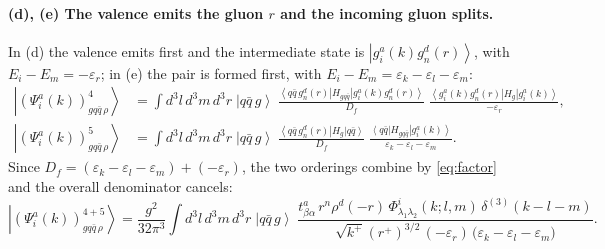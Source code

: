 \documentclass[11pt,a4paper]{article}
\numberwithin{equation}{section}
\newcommand{\eps}{\varepsilon}
\newcommand{\dthree}{\delta^{(3)}}
\newcommand{\ket}[1]{\left|#1\right\rangle}
\newcommand{\bra}[1]{\left\langle#1\right|}
\newcommand{\Ph}{\Phi}
\newcommand{\qk}[3]{q^{#1}_{#2}(#3)}
\newcommand{\aqk}[3]{\bar q^{#1}_{#2}(#3)}
\newcommand{\gl}[3]{g^{#1}_{#2}(#3)}
\begin{document}
\paragraph{(d), (e) The valence emits the gluon $r$ and the incoming gluon splits.}
\begin{center}
\hspace{0.7cm}
\end{center}
In (d) the valence emits first and the intermediate state is
$\ket{\gl{a}{i}{k}\gl{d}{n}{r}}$, with $E_{i}-E_{m}=-\eps_{r}$; in (e) the pair is formed first, with
$E_{i}-E_{m}=\eps_{k}-\eps_{l}-\eps_{m}$:
\begin{align}
\ket{(\Psi^{a}_{i}(k))^{4}_{gq\bar q\,\rho}}&=\int\!d^{3}l\,d^{3}m\,d^{3}r\;\ket{q\bar q\,g}\;
\frac{\bra{q\bar q\,\gl{d}{n}{r}}H_{gq\bar q}\ket{\gl{a}{i}{k}\gl{d}{n}{r}}}{D_{f}}\;
\frac{\bra{\gl{a}{i}{k}\gl{d}{n}{r}}H_{g}\ket{\gl{a}{i}{k}}}{-\eps_{r}},
\\
\ket{(\Psi^{a}_{i}(k))^{5}_{gq\bar q\,\rho}}&=\int\!d^{3}l\,d^{3}m\,d^{3}r\;\ket{q\bar q\,g}\;
\frac{\bra{q\bar q\,\gl{d}{n}{r}}H_{g}\ket{q\bar q}}{D_{f}}\;
\frac{\bra{q\bar q}H_{gq\bar q}\ket{\gl{a}{i}{k}}}{\eps_{k}-\eps_{l}-\eps_{m}} .
\end{align}
Since $D_{f}=(\eps_{k}-\eps_{l}-\eps_{m})+(-\eps_{r})$, the two orderings combine by
\eqref{eq:factor} and the overall denominator cancels:
\begin{equation}
\ket{(\Psi^{a}_{i}(k))^{4+5}_{gq\bar q\,\rho}}=\frac{g^{2}}{32\pi^{3}}\int\!d^{3}l\,d^{3}m\,d^{3}r\;
\ket{q\bar q\,g}\;
\frac{t^{a}_{\beta\alpha}\,r^{n}\rho^{d}(-r)\,\Ph^{i}_{\lambda_{1}\lambda_{2}}(k;l,m)\,\dthree(k-l-m)}
{\sqrt{k^{+}}(r^{+})^{3/2}\,(-\eps_{r})\,\big(\eps_{k}-\eps_{l}-\eps_{m}\big)} .
\label{eq:B3de}
\end{equation}
\end{document}
